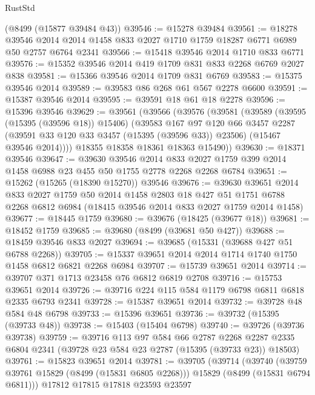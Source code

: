 \begin{lexlean}{RustStd}
\begin{coremodule}
    (@8499 (@15877 @39484 @43))
@39546 := @15278 @39484
@39561 := @18278
    @39546
    @2014
    @2014
    @1458
    @833
    @2027
    @1710
    @1759
    @18287
    @6771
    @6989
    @50
    @2757
    @6764
    @2341
@39566 := @15418 @39546 @2014 @1710 @833 @6771
@39576 := @15352 @39546 @2014 @419 @1709 @831 @833 @2268 @6769 @2027 @838
@39581 := @15366 @39546 @2014 @1709 @831 @6769
@39583 := @15375 @39546 @2014
@39589 := @39583 @86 @268 @61 @567 @2278 @6600
@39591 := @15387 @39546 @2014
@39595 := @39591 @18 @61 @18 @2278
@39596 := @15396 @39546
@39629 := @39561
    (@39566
      (@39576
        (@39581
          (@39589
            (@39595 (@15395 (@39596 @18)) @15406)
            (@39583
              @167
              @97
              @120
              @66
              @3457
              @2287
              (@39591 @33 @120 @33 @3457 (@15395 (@39596 @33)) @23506)
              (@15467 @39546 @2014))))
        @18355
        @18358
        @18361
        @18363
        @15490))
@39630 := @18371 @39546
@39647 := @39630
    @39546
    @2014
    @833
    @2027
    @1759
    @399
    @2014
    @1458
    @6988
    @23
    @455
    @50
    @1755
    @2778
    @2268
    @2268
    @6784
@39651 := @15262 (@15265 (@18390 @15270)) @39546
@39676 := @39630
    @39651
    @2014
    @833
    @2027
    @1759
    @50
    @2014
    @1458
    @2803
    @18
    @427
    @51
    @1751
    @6788
    @2268
    @6812
    @6984
    (@18415 @39546 @2014 @833 @2027 @1759 @2014 @1458)
@39677 := @18445 @1759
@39680 := @39676 (@18425 (@39677 @18))
@39681 := @18452 @1759
@39685 := @39680 (@8499 (@39681 @50 @427))
@39688 := @18459 @39546 @833 @2027
@39694 := @39685 (@15331 (@39688 @427 @51 @6788 @2268))
@39705 := @15337 @39651 @2014 @2014 @1714 @1740 @1750 @1458 @6812 @6821 @2268 @6984
@39707 := @15739 @39651 @2014
@39714 := @39707 @371 @1713 @23458 @76 @6812 @6819 @2708
@39716 := @15753 @39651 @2014
@39726 := @39716 @224 @115 @584 @1179 @6798 @6811 @6818 @2335 @6793 @2341
@39728 := @15387 @39651 @2014
@39732 := @39728 @48 @584 @48 @6798
@39733 := @15396 @39651
@39736 := @39732 (@15395 (@39733 @48))
@39738 := @15403 (@15404 @6798)
@39740 := @39726 (@39736 @39738)
@39759 := @39716
    @113
    @97
    @584
    @66
    @2787
    @2268
    @2287
    @2335
    @6804
    @2341
    (@39728 @23 @584 @23 @2787 (@15395 (@39733 @23)) @18503)
@39761 := @15823 @39651 @2014
@39781 := @39705
    (@39714
      (@39740
        (@39759 @39761 @15829 (@8499 (@15831 @6805 @2268)))
        @15829
        (@8499 (@15831 @6794 @6811)))
      @17812
      @17815
      @17818
      @23593
      @23597

\end{coremodule}
\end{lexlean}
